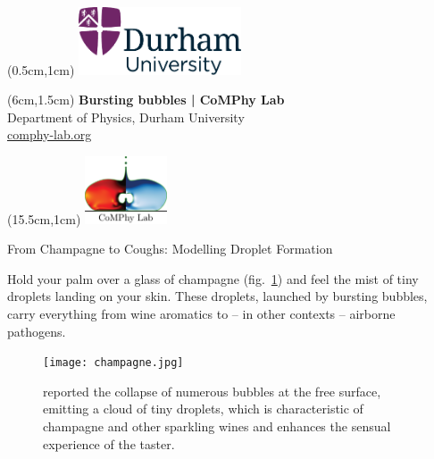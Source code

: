 \documentclass[11pt]{article}
\newlength{\headertobodysep}
\begin{document}
\thispagestyle{empty}

\textblockorigin{0pt}{0pt}

\begin{textblock*}{5cm}(0.5cm,1cm)
    \includegraphics[height=2cm]{../_logosAndRef/Durham-University.pdf}
\end{textblock*}

\begin{textblock*}{9cm}(6cm,1.5cm)
    \centering
    {\large \textbf{Bursting bubbles | CoMPhy Lab}}\\[0.2em]
    Department of Physics, Durham University\\[0.3em]
    \href{https://comphy-lab.org}{comphy-lab.org}
\end{textblock*}

\begin{textblock*}{5cm}(15.5cm,1cm) %
    \includegraphics[height=2cm]{../_logosAndRef/CoMPhy-Lab.png}
\end{textblock*}

\vspace*{\headertobodysep}

\begin{center}
    \begin{LARGE}
    From Champagne to Coughs: Modelling Droplet Formation
    \end{LARGE}
\end{center}

\noindent Hold your palm over a glass of champagne (fig.~\ref{fig:champange}) and feel the mist of tiny droplets landing on your skin. These droplets, launched by bursting bubbles, carry everything from wine aromatics to -- in other contexts -- airborne pathogens.

\begin{figure}[H]
	\begin{center}
		\texttt{[image: champagne.jpg]}
		\caption{\citet{ghabache2016evaporation} reported the collapse of numerous bubbles at the free surface, emitting a cloud of tiny droplets, which is characteristic of champagne and other sparkling wines and enhances the sensual experience of the taster.}
		\label{fig:champange}
	\end{center}
\end{figure}
\end{document}
